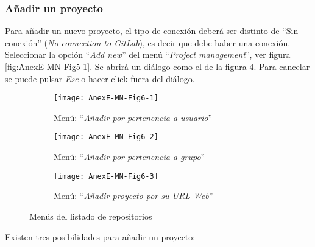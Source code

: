 \subsubsection{Añadir un proyecto}
Para añadir un nuevo proyecto, el tipo de conexión deberá ser distinto de ``Sin conexión'' (\textit{No connection to GitLab}), es decir que debe haber una conexión. Seleccionar la opción ``\textit{Add new}'' del menú ``\textit{Project management}'', ver figura \ref{fig:AnexE-MN-Fig5-1}. Se abrirá un diálogo como el de la figura \ref{fig:AnexE-MN-Fig6}. Para \underline{cancelar} se puede pulsar \textit{Esc} o hacer click fuera del diálogo.
\begin{figure}[!h]
	\centering
	\begin{subfigure}{.45\textwidth}
		\centering
		\texttt{[image: AnexE-MN-Fig6-1]}
		\caption{Menú: ``\textit{Añadir por pertenencia a usuario}''}
		\label{fig:AnexE-MN-Fig6-1}
	\end{subfigure}\hfill
	\begin{subfigure}{.45\textwidth}
		\centering
		\texttt{[image: AnexE-MN-Fig6-2]}
		\caption{Menú: ``\textit{Añadir por pertenencia a grupo}''}
		\label{fig:AnexE-MN-Fig6-2}
	\end{subfigure}
	\begin{subfigure}{.45\textwidth}
		\centering
		\texttt{[image: AnexE-MN-Fig6-3]}
		\caption{Menú: ``\textit{Añadir proyecto por su URL Web}''}
		\label{fig:AnexE-MN-Fig6-3}
	\end{subfigure}
	\caption{Menús del listado de repositorios}
	\label{fig:AnexE-MN-Fig6}
\end{figure}
Existen tres posibilidades para añadir un proyecto:

